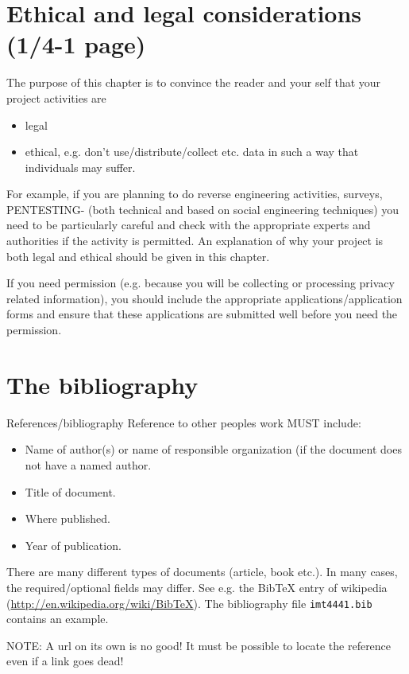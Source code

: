 \documentclass[informationsecurity]{gucmasterproject}
\begin{document}
\chapter{Ethical and legal considerations (1/4-1 page)}
The purpose of this chapter is to convince the
reader and your self that your project activities are
\begin{itemize}
\item legal
\item ethical, e.g. don't use/distribute/collect etc. data in such a way that individuals may suffer.
\end{itemize}
For example, if you are planning to do reverse engineering activities, surveys, PENTESTING- (both technical and based on social engineering techniques) you need to be particularly careful and check with the appropriate experts and authorities if the activity is permitted.  An explanation of why your project is both legal and ethical should be given in this chapter.

If you need permission (e.g. because you will be collecting or processing privacy related information), 
you should  include the appropriate applications/application forms and ensure that these applications 
are submitted well before you need the permission.


\chapter{The bibliography}
References/bibliography
Reference to other peoples work MUST include:
\begin{itemize}
\item Name of author(s)  or name of responsible organization (if the document does not have a named author.
\item Title of document.
\item Where published.
\item Year of publication.
\end{itemize}

There are many different types of documents (article, book etc.).
In many cases, the required/optional fields may differ.
See e.g. the BibTeX entry of wikipedia (\url{http://en.wikipedia.org/wiki/BibTeX}).
The bibliography file 
\verb+imt4441.bib+ 
contains an example.

NOTE: A url on its own is no good!
It must be possible to locate the reference even if a link goes dead!
\end{document}
